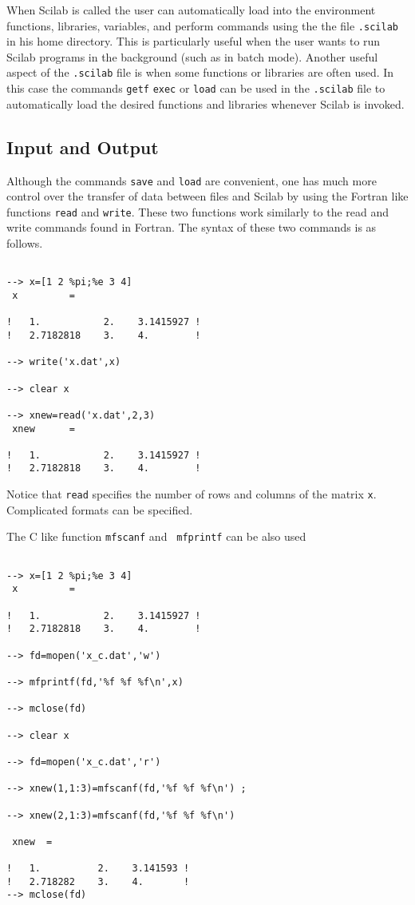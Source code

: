 	When Scilab is called the user can automatically load
into the environment functions, libraries, variables, and perform
commands using the the file {\tt .scilab} in his home directory.  
This is particularly useful when the user wants to run Scilab programs
in the background (such as in batch mode).  Another useful aspect
of the {\tt .scilab} file is when some functions or libraries
are often used.  In this case the commands {\tt getf} {\tt exec} or
{\tt load} can be used
in the {\tt .scilab} file to automatically load the desired 
functions and libraries whenever Scilab is invoked.

\subsection{Input and Output}
\label{s5.3}

	Although the commands {\tt save} and {\tt load} are
convenient, one has much more control over the transfer of
data between files and Scilab by using the Fortran like functions 
{\tt read}
and {\tt write}.  
These two functions work similarly to the
read and write commands found in Fortran.  The syntax of these
two commands is as follows.  
\begin{verbatim}
 
--> x=[1 2 %pi;%e 3 4]
 x         =
 
!   1.           2.    3.1415927 !
!   2.7182818    3.    4.        !
 
--> write('x.dat',x)
 
--> clear x
 
--> xnew=read('x.dat',2,3)
 xnew      =
 
!   1.           2.    3.1415927 !
!   2.7182818    3.    4.        !
\end{verbatim}
Notice that {\tt read} specifies the number of rows and columns
of the matrix {\tt x}. Complicated formats can be specified. 

The C like function {\tt mfscanf}  and {\tt
mfprintf}  can be also used
\begin{verbatim}
 
--> x=[1 2 %pi;%e 3 4]
 x         =
 
!   1.           2.    3.1415927 !
!   2.7182818    3.    4.        !
 
--> fd=mopen('x_c.dat','w')

--> mfprintf(fd,'%f %f %f\n',x)

--> mclose(fd)
 
--> clear x
 
--> fd=mopen('x_c.dat','r')

--> xnew(1,1:3)=mfscanf(fd,'%f %f %f\n') ;

--> xnew(2,1:3)=mfscanf(fd,'%f %f %f\n')

 xnew  =
 
!   1.          2.    3.141593 !
!   2.718282    3.    4.       !
--> mclose(fd)
\end{verbatim}

